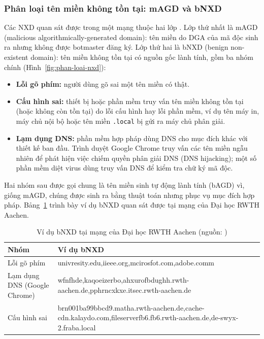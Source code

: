 \subsubsection{Phân loại tên miền không tồn tại: mAGD và bNXD}\label{sec:phan-loai-nxd}

Các NXD quan sát được trong một mạng thuộc hai lớp \cite{schuppen2018fanci}. Lớp thứ nhất là mAGD (malicious algorithmically-generated domain): tên miền do DGA của mã độc sinh ra nhưng không được botmaster đăng ký. Lớp thứ hai là bNXD (benign non-existent domain): tên miền không tồn tại có nguồn gốc lành tính, gồm ba nhóm chính (Hình~\ref{fig:phan-loai-nxd}):
\begin{itemize}
    \item \textbf{Lỗi gõ phím:} người dùng gõ sai một tên miền có thật.
    \item \textbf{Cấu hình sai:} thiết bị hoặc phần mềm truy vấn tên miền không tồn tại (hoặc không còn tồn tại) do lỗi cấu hình hay lỗi phần mềm, ví dụ tên máy in, máy chủ nội bộ hoặc tên miền \texttt{.local} bị gửi ra máy chủ phân giải.
    \item \textbf{Lạm dụng DNS:} phần mềm hợp pháp dùng DNS cho mục đích khác với thiết kế ban đầu. Trình duyệt Google Chrome truy vấn các tên miền ngẫu nhiên để phát hiện việc chiếm quyền phân giải DNS (DNS hijacking); một số phần mềm diệt virus dùng truy vấn DNS để kiểm tra chữ ký mã độc.
\end{itemize}
Hai nhóm sau được gọi chung là tên miền sinh tự động lành tính (bAGD) vì, giống mAGD, chúng được sinh ra bằng thuật toán nhưng phục vụ mục đích hợp pháp. Bảng~\ref{tab:vi-du-bnxd} trình bày ví dụ bNXD quan sát được tại mạng của Đại học RWTH Aachen.



\begin{table}[H]
\centering
\caption{Ví dụ bNXD tại mạng của Đại học RWTH Aachen (nguồn: \cite{schuppen2018fanci})}
\label{tab:vi-du-bnxd}
\begin{tabularx}{\textwidth}{|>{\raggedright\arraybackslash}m{3.2cm}|>{\raggedright\arraybackslash}X|}
\hline
\rowcolor{LightCyan}
\textbf{Nhóm} & \textbf{Ví dụ bNXD} \\
\hline
Lỗi gõ phím & {\ttfamily\footnotesize univresity.edu,\quad iieee.org,\quad mcirosfot.com,\quad adobe.comm} \\
\hline
Lạm dụng DNS (Google Chrome) & {\ttfamily\footnotesize wfnfhde,\quad kaqoeizerbo,\quad ahxurofbdughh.rwth-aachen.de,\newline pphrncxkxe.itsec.rwth-aachen.de} \\
\hline
Cấu hình sai & {\ttfamily\footnotesize brn001ba99bbcd9.matha.rwth-aachen.de,\quad cache-cdn.kalaydo.com,\newline fileserverfb6.fb6.rwth-aachen.de,\quad de-swyx-2.fraba.local} \\
\hline
\end{tabularx}
\end{table}

